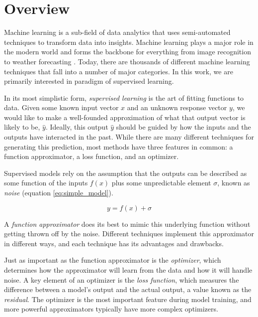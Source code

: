 \section{Overview}

Machine learning is a sub-field of data analytics that uses semi-automated techniques to transform data into insights. Machine learning plays a major role in the modern world and forms the backbone for everything from image recognition \citep{Davis2018Real-TimeDrones} to weather forecasting \citep{McGovern2017UsingWeather}. Today, there are thousands of different machine learning techniques that fall into a number of major categories. In this work, we are primarily interested in paradigm of supervised learning.

In its most simplistic form, \textit{supervised learning} is the art of fitting functions to data. Given some known input vector $x$ and an unknown response vector $y$, we would like to make a well-founded approximation of what that output vector is likely to be, $\hat{y}$. Ideally, this output $\hat{y}$ should be guided by how the inputs and the outputs have interacted in the past. While there are many different techniques for generating this prediction, most methods have three features in common: a function approximator, a loss function, and an optimizer. 
   
Supervised models rely on the assumption that the outputs can be described as some function of the inputs $f(x)$ plus some unpredictable element $\sigma$, known as \textit{noise} (equation \ref{eq:simple_model}). 

\begin{equation}
    \label{eq:simple_model}
    y = f(x) + \sigma
\end{equation}

A \textit{function approximator} does its best to mimic this underlying function without getting thrown off by the noise. Different techniques implement this approximator in different ways, and each technique has its advantages and drawbacks.

Just as important as the function approximator is the \textit{optimizer}, which determines how the approximator will learn from the data and how it will handle noise. A key element of an optimizer is the \textit{loss function}, which measures the difference between a model’s output and the actual output, a value known as the \textit{residual}. The optimizer is the most important feature during model training, and more powerful approximators typically have more complex optimizers. 

